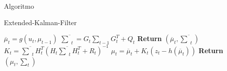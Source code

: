 Algoritmo

\begin{algorithm}[H]
    \caption{Extended-Kalman-Filter}
    \begin{algorithmic}[1]
        \State $\overline{\mu}_t = g(u_t, \mu_{t-1})$
        \State $ \overline{\textstyle\sum}_t = G_t {\textstyle\sum}_{t-1} G_t^T+ Q_t$ 
        \State \textbf{Return} $\left(\overline{\mu}_t, \overline{\textstyle\sum}_t\right)$
    \EndProcedure
        \State $K_t = \overline{\textstyle\sum}_tH_t^T(H_t\overline{\textstyle\sum}_tH_t^T+R_t)^{-1}$
        \State $\mu_t  = \overline{\mu}_t + K_t(z_t -h(\overline\mu_t))$
        \State \textbf{Return} $\left(\mu_t, \textstyle\sum_t\right)$
    \EndProcedure
    \end{algorithmic}
\end{algorithm}


        
        

